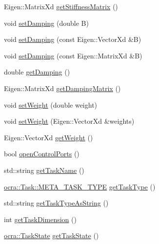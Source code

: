 \begin{DoxyCompactItemize}
Eigen\+::\+Matrix\+Xd \hyperlink{classocra__recipes_1_1TaskConnection_abbcaa5c1769afc4e4074486fe4fb319a}{get\+Stiffness\+Matrix} ()
\item 
void \hyperlink{classocra__recipes_1_1TaskConnection_a4f9c4b7b99c41c817b5c9448464b84bc}{set\+Damping} (double B)
\item 
void \hyperlink{classocra__recipes_1_1TaskConnection_ae831590f6b0139cfaff4e54286dc4438}{set\+Damping} (const Eigen\+::\+Vector\+Xd \&B)
\item 
void \hyperlink{classocra__recipes_1_1TaskConnection_a143aba34caf53044de8adb6ac94f4e29}{set\+Damping} (const Eigen\+::\+Matrix\+Xd \&B)
\item 
double \hyperlink{classocra__recipes_1_1TaskConnection_a7d659e4a155f8a0942bb71d193b95385}{get\+Damping} ()
\item 
Eigen\+::\+Matrix\+Xd \hyperlink{classocra__recipes_1_1TaskConnection_a4176118231f2c5e17e4f749999c9456e}{get\+Damping\+Matrix} ()
\item 
void \hyperlink{classocra__recipes_1_1TaskConnection_ad833849636700c3174f305d10fcc00bf}{set\+Weight} (double weight)
\item 
void \hyperlink{classocra__recipes_1_1TaskConnection_ad03415eb9f2107be39cb44399fb0afd7}{set\+Weight} (Eigen\+::\+Vector\+Xd \&weights)
\item 
Eigen\+::\+Vector\+Xd \hyperlink{classocra__recipes_1_1TaskConnection_a44930029ade716c0ebbe04fba658cf7e}{get\+Weight} ()
\item 
bool \hyperlink{classocra__recipes_1_1TaskConnection_ab7feddafb3948aaf67bf00b227591694}{open\+Control\+Ports} ()
\item 
std\+::string \hyperlink{classocra__recipes_1_1TaskConnection_ad33b58e0bf6e0f7051b0187435b014f9}{get\+Task\+Name} ()
\item 
\hyperlink{classocra_1_1Task_a8ddf2840d178ca273e886c9ca95248fe}{ocra\+::\+Task\+::\+M\+E\+T\+A\+\_\+\+T\+A\+S\+K\+\_\+\+T\+Y\+PE} \hyperlink{classocra__recipes_1_1TaskConnection_ac5a29440c295728f97b5a5f6df69924f}{get\+Task\+Type} ()
\item 
std\+::string \hyperlink{classocra__recipes_1_1TaskConnection_aab1504531e1371df092a8c589b100e1c}{get\+Task\+Type\+As\+String} ()
\item 
int \hyperlink{classocra__recipes_1_1TaskConnection_a14a0075a94a7df0f912b7dbd8f56d8e2}{get\+Task\+Dimension} ()
\item 
\hyperlink{classocra_1_1TaskState}{ocra\+::\+Task\+State} \hyperlink{classocra__recipes_1_1TaskConnection_ae85f5279d0fe6b8c63ee9736f6308583}{get\+Task\+State} ()

\end{DoxyCompactItemize}
